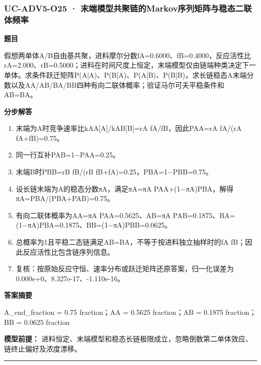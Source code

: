 \documentclass[UTF8,11pt,a4paper]{ctexart}
\begin{document}
\subsubsection*{UC-ADV5-O25 · 末端模型共聚链的Markov序列矩阵与稳态二联体频率}
\noindent\textbf{题目}\par
假想两单体A/B自由基共聚，进料摩尔分数fA=0.6000、fB=0.4000，反应活性比rA=2.000、rB=0.5000；进料在时间尺度上恒定，末端模型仅由链端种类决定下一单体。求条件跃迁矩阵P(A|A)、P(B|A)、P(A|B)、P(B|B)，求长链稳态A末端分数以及AA/AB/BA/BB四种有向二联体概率；验证马尔可夫平稳条件和AB=BA。\par
\medskip\noindent\textbf{分步解答}
\begin{enumerate}
\item 末端为A时竞争速率比kAA[A]/kAB[B]=rA fA/fB，因此PAA=rA fA/(rA fA+fB)=0.75。
\item 同一行互补PAB=1−PAA=0.25。
\item 末端B时PBB=rB fB/(rB fB+fA)=0.25，PBA=1−PBB=0.75。
\item 设长链末端为A的稳态分数πA，满足πA=πA PAA+(1−πA)PBA，解得πA=PBA/(PBA+PAB)=0.75。
\item 有向二联体概率为AA=πA PAA=0.5625、AB=πA PAB=0.1875、BA=(1−πA)PBA=0.1875、BB=(1−πA)PBB=0.0625。
\item 总概率为1且平稳二态链满足AB=BA，不等于按进料独立抽样时的fA fB；因此反应活性比包含链序列信息。
\item 复核：按原始反应守恒、速率分布或跃迁矩阵还原答案，归一化误差为0.000e+0、8.327e-17、-1.110e-16。
\end{enumerate}
\noindent\textbf{答案摘要}\par
A\_end\_fraction = 0.75 fraction；AA = 0.5625 fraction；AB = 0.1875 fraction；BB = 0.0625 fraction\par
\noindent\textbf{模型前提：}
进料恒定、末端模型和稳态长链极限成立，忽略倒数第二单体效应、链终止偏好及浓度漂移。\par
\medskip\hrule\medskip
{}
\end{document}
